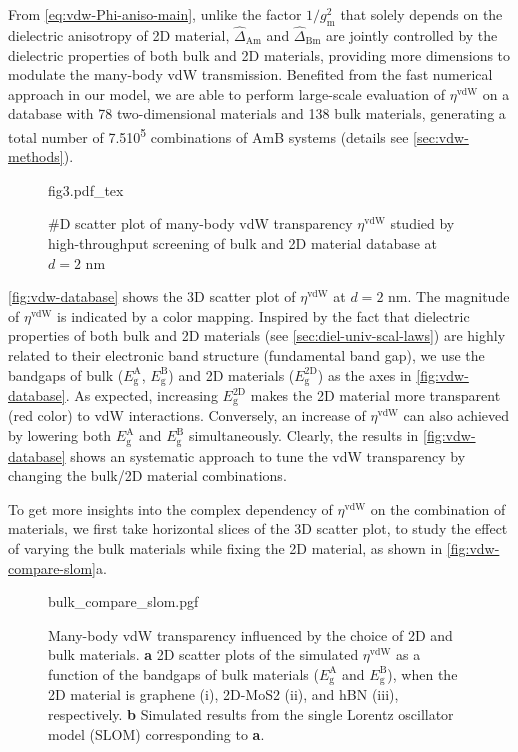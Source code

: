 From \autoref{eq:vdw-Phi-aniso-main}, unlike the factor
\(1/g_{\mathrm{m}}^{2}\) that solely depends on the dielectric
anisotropy of 2D material, \(\hat{\Delta}_{\mathrm{Am}}\) and
\(\hat{\Delta}_{\mathrm{Bm}}\) are jointly controlled by the
dielectric properties of both bulk and 2D materials, providing more
dimensions to modulate the many-body vdW transmission.
%
Benefited from
the fast numerical approach in our model, we are able to perform
large-scale evaluation of $\eta^{\mathrm{vdW}}$ on a database with
78 two-dimensional materials and 138 bulk materials, generating a total number of
7.5\texttimes{}10\textsuperscript{5} combinations of AmB systems
(details see \autoref{sec:vdw-methods}).
%
\begin{figure}[!htbp]
  \centering{}
  {fig3.pdf_tex}
  \caption{\label{fig:vdw-database} %
    #D scatter plot of many-body vdW transparency
    $\eta^{\mathrm{vdW}}$ studied by high-throughput screening of bulk
    and 2D material database at $d=2$ nm}
\end{figure}

\autoref{fig:vdw-database} shows the 3D scatter plot of
\(\eta^{\mathrm{vdW}}\) at \(d=2\) nm. The magnitude of
$\eta^{\mathrm{vdW}}$ is indicated by a color mapping.
%
Inspired by the fact that dielectric properties of both bulk
\cite{Moss_1950} and 2D materials (see
\autoref{sec:diel-univ-scal-laws}) are highly related to their
electronic band structure (\ie fundamental band gap), we use the
bandgaps of bulk (\(E_{\mathrm{g}}^{\mathrm{A}}\),
\(E_{\mathrm{g}}^{\mathrm{B}}\)) and 2D materials
(\(E_{\mathrm{g}}^{\mathrm{2D}}\)) as the axes in
\autoref{fig:vdw-database}.
%
As expected, increasing \(E_{\mathrm{g}}^{\mathrm{2D}}\) makes the 2D
material more transparent (red color) to vdW interactions.
%
Conversely, an increase of \(\eta^{\mathrm{vdW}}\) can also achieved
by lowering both \(E_{\mathrm{g}}^{\mathrm{A}}\) and
\(E_{\mathrm{g}}^{\mathrm{B}}\) simultaneously.
%
Clearly, the results in \autoref{fig:vdw-database} shows an systematic
approach to tune the vdW transparency by changing the bulk/2D material
combinations.


To get more insights into the complex dependency of
\(\eta^{\mathrm{vdW}}\) on the combination of materials, we first take
horizontal slices of the 3D scatter plot, to study the effect of
varying the bulk materials while fixing the 2D material, as shown in
\autoref{fig:vdw-compare-slom}a.
%
\begin{figure}[h!]
  \centering{}
  {bulk_compare_slom.pgf}
  \caption{\label{fig:vdw-compare-slom}%
    Many-body vdW transparency influenced by the choice of 2D and bulk
    materials. \textbf{a} 2D scatter plots of the simulated
    $\eta^{\mathrm{vdW}}$ as a function of the bandgaps of bulk
    materials ($E_{\mathrm{g}}^{\mathrm{A}}$ and
    $E_{\mathrm{g}}^{\mathrm{B}}$), when the 2D material is graphene
    (i), 2D-MoS2 (ii), and hBN (iii), respectively.  \textbf{b}
    Simulated results from the single Lorentz oscillator model (SLOM)
    corresponding to \textbf{a}.}
\end{figure}
%

